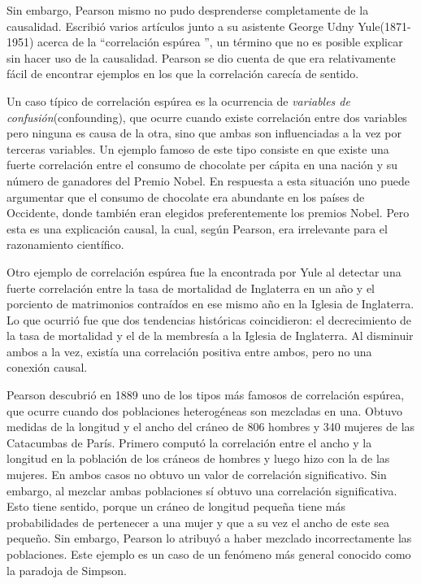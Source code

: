 \begin{introduction}
	Sin embargo, Pearson mismo no pudo desprenderse completamente de la causalidad. Escribió varios artículos junto a su asistente George Udny Yule(1871-1951) acerca de la \textquotedblleft correlación espúrea \textquotedblright, un término que no es posible explicar sin hacer uso de la causalidad. Pearson se dio cuenta de que era relativamente fácil de encontrar ejemplos en los que la correlación carecía de sentido. 
	
	Un caso típico de correlación espúrea es la ocurrencia de \textit{variables de confusión}(confounding), que ocurre cuando existe correlación entre dos variables pero ninguna es causa de la otra, sino que ambas son influenciadas a la vez por terceras variables. Un ejemplo famoso de este tipo consiste en que existe una fuerte correlación entre el consumo de chocolate per cápita en una nación y su número de ganadores del Premio Nobel. En respuesta a esta situación uno puede argumentar que el consumo de chocolate era abundante en los países de Occidente, donde también eran elegidos preferentemente los premios Nobel. Pero esta es una explicación causal, la cual, según Pearson, era irrelevante para el razonamiento científico.
	
	Otro ejemplo de correlación espúrea fue la encontrada por Yule al detectar una fuerte correlación entre la tasa de mortalidad de Inglaterra en un año y el porciento de matrimonios contraídos en ese mismo año en la Iglesia de Inglaterra. Lo que ocurrió fue que dos tendencias históricas coincidieron: el decrecimiento de la tasa de mortalidad y el de la membresía a la Iglesia de Inglaterra. Al disminuir ambos a la vez, existía una correlación positiva entre ambos, pero no una conexión causal.
	
	Pearson descubrió en 1889 uno de los tipos más famosos de correlación espúrea, que ocurre cuando dos poblaciones heterogéneas son mezcladas en una. Obtuvo medidas de la longitud y el ancho del cráneo de 806 hombres y 340 mujeres de las Catacumbas de París. Primero computó la correlación entre el ancho y la longitud en la población de los cráneos de hombres y luego hizo con la de las mujeres. En ambos casos no obtuvo un valor de correlación significativo. Sin embargo, al mezclar ambas poblaciones sí obtuvo una correlación significativa. Esto tiene sentido, porque un cráneo de longitud pequeña tiene más probabilidades de pertenecer a una mujer y que a su vez el ancho de este sea pequeño. Sin embargo, Pearson lo atribuyó a haber mezclado incorrectamente las poblaciones. Este ejemplo es un caso de un fenómeno más general conocido como la paradoja de Simpson.\cite{PearlMackenzie18}
	

\end{introduction}
